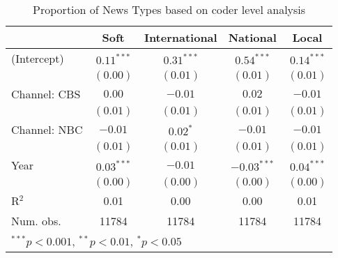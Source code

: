 
\begin{table}
\caption{Proportion of News Types based on coder level analysis}
\begin{center}
\begin{tabular}{l c c c c }
\hline
 & Soft & International & National & Local \\
\hline
(Intercept)  & $0.11^{***}$ & $0.31^{***}$ & $0.54^{***}$  & $0.14^{***}$ \\
             & $(0.00)$     & $(0.01)$     & $(0.01)$      & $(0.01)$     \\
Channel: CBS & $0.00$       & $-0.01$      & $0.02$        & $-0.01$      \\
             & $(0.01)$     & $(0.01)$     & $(0.01)$      & $(0.01)$     \\
Channel: NBC & $-0.01$      & $0.02^{*}$   & $-0.01$       & $-0.01$      \\
             & $(0.01)$     & $(0.01)$     & $(0.01)$      & $(0.01)$     \\
Year         & $0.03^{***}$ & $-0.01$      & $-0.03^{***}$ & $0.04^{***}$ \\
             & $(0.00)$     & $(0.00)$     & $(0.00)$      & $(0.00)$     \\
\hline
R$^2$        & 0.01         & 0.00         & 0.00          & 0.01         \\
Num. obs.    & 11784        & 11784        & 11784         & 11784        \\
\hline
\multicolumn{5}{l}{\scriptsize{$^{***}p<0.001$, $^{**}p<0.01$, $^*p<0.05$}}
\end{tabular}
\label{tab:news_over_time_show}
\end{center}
\end{table}
